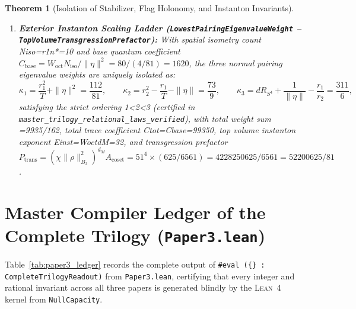 \documentclass[11pt,reqno]{amsart}
\newtheorem{theorem}{Theorem}[section]
\theoremstyle{definition}
\theoremstyle{remark}
\begin{document}
\begin{theorem}[Isolation of Stabilizer, Flag Holonomy, and Instanton Invariants]
\begin{enumerate}[label=(\roman*)]
  with twisted hierarchy ratio Rtw=p2/p12=163840/204363.
  \item \textbf{Exterior Instanton Scaling Ladder (\texttt{LowestPairingEigenvalueWeight} -- \texttt{TopVolumeTransgressionPrefactor}):} With spatial isometry count Niso=r1n*=10 and base quantum coefficient $C_{\mathrm{base}} = W_{\mathrm{oct}} N_{\mathrm{iso}} / \|\eta\|^2 = 80 / (4/81) = 1620$, the three normal pairing eigenvalue weights are uniquely isolated as:
  \begin{equation}
    \kappa_1 = \frac{r_1^2}{T} + \|\eta\|^2 = \frac{112}{81}, \qquad
    \kappa_2 = r_2^2 - \frac{r_1}{T} - \|\eta\| = \frac{73}{9}, \qquad
    \kappa_3 = d R_{S^4} + \frac{1}{\|\eta\|} - \frac{r_1}{r_2} = \frac{311}{6},
  \end{equation}
  satisfying the strict ordering 1<2<3 (certified in \texttt{master\_trilogy\_relational\_laws\_verified}), with total weight sum =9935/162, total trace coefficient Ctot=Cbase=99350, top volume instanton exponent Einst=WoctdM=32, and transgression prefactor $P_{\mathrm{trans}} = (\chi \|\rho\|_{B_2}^2)^{d_M} A_{\mathrm{coset}} = 51^4 \times (625/6561) = 4228250625 / 6561 = 52200625 / 81$.
\end{enumerate}
\end{theorem}

\section{Master Compiler Ledger of the Complete Trilogy (\texttt{Paper3.lean})}

Table~\ref{tab:paper3_ledger} records the complete output of \texttt{\#eval (\{\} : CompleteTrilogyReadout)} from \texttt{Paper3.lean}, certifying that every integer and rational invariant across all three papers is generated blindly by the \textsc{Lean~4} kernel from \texttt{NullCapacity}.
\end{document}
